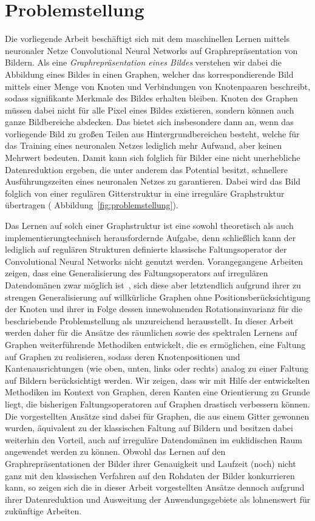\section{Problemstellung}
\label{problemstellung}

Die vorliegende Arbeit beschäftigt sich mit dem maschinellen Lernen mittels neuronaler Netze \bzw{} Convolutional Neural Networks auf Graphrepräsentation von Bildern.
Als eine \emph{Graphrepräsentation eines Bildes} verstehen wir dabei die Abbildung eines Bildes in einen Graphen, welcher das korrespondierende Bild mittels einer Menge von Knoten und Verbindungen von Knotenpaaren beschreibt, sodass signifikante Merkmale des Bildes erhalten bleiben.
Knoten des Graphen müssen dabei nicht für alle Pixel eines Bildes existieren, sondern können auch ganze Bildbereiche abdecken.
Das bietet sich insbesondere dann an, wenn das vorliegende Bild zu großen Teilen aus Hintergrundbereichen besteht, welche für das Training eines neuronalen Netzes lediglich mehr Aufwand, aber keinen Mehrwert bedeuten.
Damit kann sich folglich für Bilder eine nicht unerhebliche Datenreduktion ergeben, die unter anderem das Potential besitzt, schnellere Ausführungszeiten eines neuronalen Netzes zu garantieren.
Dabei wird das Bild folglich von einer regulären Gitterstruktur in eine irreguläre Graphstruktur übertragen (\vgl{} Abbildung~\ref{fig:problemstellung}).

Das Lernen auf solch einer Graphstruktur ist eine sowohl theoretisch als auch implementierungtechnisch herausfordernde Aufgabe, denn schließlich kann der lediglich auf regulären Strukturen definierte klassische Faltungsoperator der Convolutional Neural Networks nicht genutzt werden.
Vorangegangene Arbeiten zeigen, dass eine Generalisierung des Faltungsoperators auf irregulären Datendomänen zwar möglich ist~\cite{patchy, Defferrard, gcn}, sich diese aber letztendlich aufgrund ihrer zu strengen Generalisierung auf willkürliche Graphen ohne Positionsberücksichtigung der Knoten und ihrer in Folge dessen innewohnenden Rotationsinvarianz für die beschriebende Problemstellung als unzureichend herausstellt.
In dieser Arbeit werden daher für die Ansätze des räumlichen sowie des spektralen Lernens auf Graphen weiterführende Methodiken entwickelt, die es ermöglichen, eine Faltung auf Graphen zu realisieren, sodass deren Knotenpositionen und Kantenausrichtungen (wie oben, unten, links oder rechts) analog zu einer Faltung auf Bildern berücksichtigt werden.
Wir zeigen, dass wir mit Hilfe der entwickelten Methodiken im Kontext von Graphen, deren Kanten eine Orientierung zu Grunde liegt, die bisherigen Faltungsoperatoren auf Graphen drastisch verbessern können.
Die vorgestellten Ansätze sind dabei für Graphen, die aus einem Gitter gewonnen wurden, äquivalent zu der klassischen Faltung auf Bildern und besitzen dabei weiterhin den Vorteil, auch auf irreguläre Datendomänen im euklidischen Raum angewendet werden zu können.
Obwohl das Lernen auf den Graphrepräsentationen der Bilder \bzgl{} ihrer Genauigkeit und Laufzeit (noch) nicht ganz mit den klassischen Verfahren auf den Rohdaten der Bilder konkurrieren kann, so zeigen sich die in dieser Arbeit vorgestellten Ansätze dennoch aufgrund ihrer Datenreduktion und Ausweitung der Anwendungsgebiete als lohnenswert für zukünftige Arbeiten.
